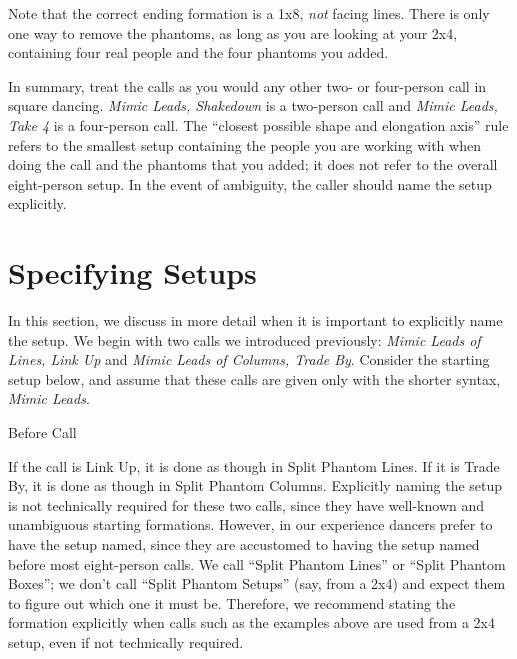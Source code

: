 \documentclass[12pt]{article}
\begin{document}
Note that the correct ending formation is a 1x8, \emph{not} facing lines.
There is only one way to remove the phantoms, as long as you are
looking at your 2x4, containing four real people and the
four phantoms you added.

In summary, treat the calls as you would any other two- or four-person
call in square dancing.  
\emph{Mimic Leads, Shakedown} is a two-person call and
\emph{Mimic Leads, Take 4} is a four-person call.
The ``closest possible shape and elongation axis'' rule refers to the
smallest setup containing the people you are working with when doing the
call and the phantoms that you added; it does not refer to the
overall eight-person setup.
In the event of ambiguity, the caller
should name the setup explicitly.

\section{Specifying Setups}
\label{specifyingsetups}

In this section, we discuss in more detail when it is important
to explicitly name the setup.
We begin with two calls we introduced previously:
\emph{Mimic Leads of Lines, Link Up} and
\emph{Mimic Leads of Columns, Trade By}.
Consider the starting setup below, and assume that these
calls are given only with the shorter syntax, 
\emph{Mimic Leads}.

\displaytwo
{\cr
 }
{Before Call}
{\cr
 \cr
 \cr
 }
{}

If the call is Link Up, it is done as though in Split Phantom Lines.
If it is Trade By, it is done as though in Split Phantom Columns.
Explicitly naming the setup is not technically required for these two calls,
since they have well-known and unambiguous starting formations.
However, in our experience dancers prefer to have the setup named,
since they are accustomed to having the setup named before most
eight-person calls.
We call ``Split Phantom Lines'' or ``Split Phantom Boxes'';
we don't call ``Split Phantom Setups'' (say, from a 2x4)
and expect them to figure out which one it must be.
Therefore, we recommend stating the formation explicitly
when calls such as the examples above are used from a 2x4 setup,
even if not technically required.
\end{document}
